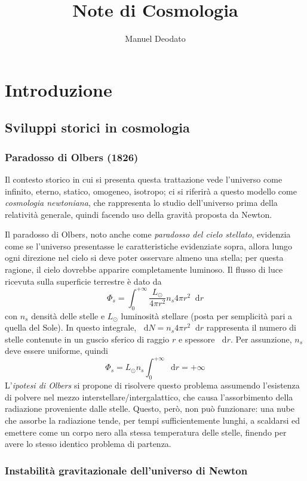 \documentclass[11pt, a4paper]{scrartcl}
\title{Note di Cosmologia}
\author{Manuel Deodato}
\date{}
\theoremstyle{style}
\theoremstyle{style1}
\renewcommand{\maketitle}{
\begin{center}
{\sffamily
{\fontsize{20}{20}\selectfont\MakeUppercase\thetitle}}

\vspace{0.2in}

{\large\scshape\sffamily\theauthor}
\end{center}
}
\newcommand{\dd}{\mathop{}\!\mathrm{d}}
\numberwithin{equation}{subsection}
\begin{document}
\maketitle
\newpage
\tableofcontents 
\newpage
\section{Introduzione}
\subsection{Sviluppi storici in cosmologia}
\subsubsection{Paradosso di Olbers (1826)}
Il contesto storico in cui si presenta questa trattazione vede l'universo come infinito, eterno, statico, omogeneo, isotropo; ci si riferir\`a a questo modello come \textit{cosmologia newtoniana}, che rappresenta lo studio dell'universo prima della relativit\`a generale, quindi facendo uso della gravit\`a proposta da Newton.

Il paradosso di Olbers, noto anche come \textit{paradosso del cielo stellato}, evidenzia come se l'universo presentasse le caratteristiche evidenziate sopra, allora lungo ogni direzione nel cielo si deve poter osservare almeno una stella; per questa ragione, il cielo dovrebbe apparire completamente luminoso.
Il flusso di luce ricevuta sulla superficie terrestre \`e dato da
\[
\Phi_s = \int _0^{+\infty} \frac{L_\odot }{4 \pi r^2} n_s 4 \pi r^2 \dd r
\] 
con $n_s$ densit\`a delle stelle e $L_\odot $ luminosit\`a stellare (posta per semplicit\`a pari a quella del Sole).
In questo integrale, $\dd N = n_s 4 \pi r^2 \dd r$ rappresenta il numero di stelle contenute in un guscio sferico di raggio $r$ e spessore $\dd r$.
Per assunzione, $n_s$ deve essere uniforme, quindi
\[
\Phi_s = L_\odot  n_s \int _0^{+\infty} \dd r = +\infty
\] 
L'\textit{ipotesi di Olbers} si propone di risolvere questo problema assumendo l'esistenza di polvere nel mezzo interstellare/intergalattico, che causa l'assorbimento della radiazione proveniente dalle stelle.
Questo, per\`o, non pu\`o funzionare: una nube che assorbe la radiazione tende, per tempi sufficientemente lunghi, a scaldarsi ed emettere come un corpo nero alla stessa temperatura delle stelle, finendo per avere lo stesso identico problema di partenza.

\subsubsection{Instabilit\`a gravitazionale dell'universo di Newton}
\end{document}
